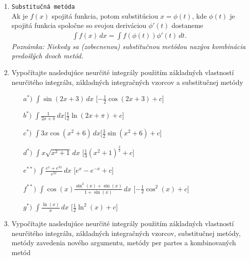 \begin{enumerate}
\item  \texttt{Substitučná metóda} \\
Ak je $f(x)$ spojitá funkcia, potom substitúciou $x=\phi(t)$, kde $\phi(t)$ je spojitá funkcia spoločne so svojou deriváciou $\phi'(t)$ dostaneme
\begin{align*}
\int f(x) \, dx=\int f(\phi(t))\phi'(t) \, dt.
\end{align*}
\textit{Poznámka: Niekedy sa (zobecnenou) substitučnou metódou nazýva kombinácia predošlých dvoch metód.}

\item Vypočítajte nasledujúce neurčité integrály použitím základných vlastností neurčitého integrálu, základných integračných vzorcov a substitučnej metódy
\begin{enumerate}
\item[$a^{*})$]{$ \int \sin(2x+3) \,dx$}\hspace{\fill} [$-\frac{1}{2}\cos(2x+3) +c$]
\item[$b^{*})$]{$ \int \frac{1}{2x+\pi} \,dx$}\hspace{\fill}[$\frac{1}{2}\ln(2x+\pi) +c$]
\item[$c^{*})$]{$ \int 3x\cos(x^2+6) \,dx$}\hspace{\fill}[$\frac{3}{2}\sin(x^2+6) +c$]
\item[$d^{*})$]{$ \int x\sqrt{x^2+1} \,dx$}
\hspace{\fill}[$\frac{1}{3}(x^2+1)^{\frac{3}{2}} +c$]
\item[$e^{**})$]{$ \int \frac{e^x+e^{3x}}{e^{2x}} \,dx$}
\hspace{\fill}[$e^x-e^{-x} +c$]
\item[$f^{**})$]{$ \int \cos(x)\frac{\sin^2(x)+\sin(x)}{1+\sin(x)} \,dx$}
\hspace{\fill}[$-\frac{1}{2}\cos^2(x) +c$]
\item[$g^{*})$]{$ \int \frac{\ln(x)}{x} \,dx$}
\hspace{\fill}[$\frac{1}{2}\ln^2(x) +c$]
\end{enumerate}


\item Vypočítajte nasledujúce neurčité integrály použitím základných vlastností neurčitého integrálu, základných integračných vzorcov, substitučnej metódy, metódy zavedenia nového argumentu, metódy per partes a kombinovaných metód


\end{enumerate}
